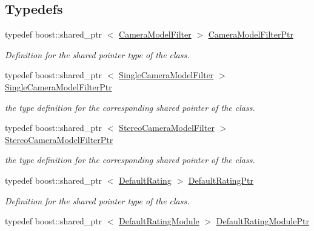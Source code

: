 \subsection*{\-Typedefs}
\begin{DoxyCompactItemize}
\item 
typedef boost\-::shared\-\_\-ptr\*
$<$ \hyperlink{classnext__best__view_1_1CameraModelFilter}{\-Camera\-Model\-Filter} $>$ \hyperlink{namespacenext__best__view_a75c548145a1fdcdc491efbda66e9f440}{\-Camera\-Model\-Filter\-Ptr}
\begin{DoxyCompactList}\small\item\em \-Definition for the shared pointer type of the class. \end{DoxyCompactList}\item 
typedef boost\-::shared\-\_\-ptr\*
$<$ \hyperlink{classnext__best__view_1_1SingleCameraModelFilter}{\-Single\-Camera\-Model\-Filter} $>$ \hyperlink{namespacenext__best__view_a5abe7f8b4a8bdb1bdaf55043e4de9a64}{\-Single\-Camera\-Model\-Filter\-Ptr}
\begin{DoxyCompactList}\small\item\em the type definition for the corresponding shared pointer of the class. \end{DoxyCompactList}\item 
typedef boost\-::shared\-\_\-ptr\*
$<$ \hyperlink{classnext__best__view_1_1StereoCameraModelFilter}{\-Stereo\-Camera\-Model\-Filter} $>$ \hyperlink{namespacenext__best__view_aa4826bd6041da0bd02906ca80ec2d67a}{\-Stereo\-Camera\-Model\-Filter\-Ptr}
\begin{DoxyCompactList}\small\item\em the type definition for the corresponding shared pointer of the class. \end{DoxyCompactList}\item 
typedef boost\-::shared\-\_\-ptr\*
$<$ \hyperlink{structnext__best__view_1_1DefaultRating}{\-Default\-Rating} $>$ \hyperlink{namespacenext__best__view_a91ab4012a2b5a5b1eb58d852de7c87dc}{\-Default\-Rating\-Ptr}
\begin{DoxyCompactList}\small\item\em \-Definition for the shared pointer type of the class. \end{DoxyCompactList}\item 
typedef boost\-::shared\-\_\-ptr\*
$<$ \hyperlink{classnext__best__view_1_1DefaultRatingModule}{\-Default\-Rating\-Module} $>$ \hyperlink{namespacenext__best__view_abb8767435c6611d0d51d80da6bcd01ae}{\-Default\-Rating\-Module\-Ptr}

\end{DoxyCompactItemize}
